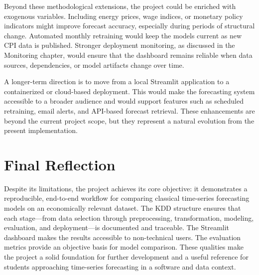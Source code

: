 Beyond these methodological extensions, the project could be enriched with exogenous variables. Including energy prices, wage indices, or monetary policy indicators might improve forecast accuracy, especially during periods of structural change. Automated monthly retraining would keep the models current as new CPI data is published. Stronger deployment monitoring, as discussed in the Monitoring chapter, would ensure that the dashboard remains reliable when data sources, dependencies, or model artifacts change over time.

A longer-term direction is to move from a local Streamlit application to a containerized or cloud-based deployment. This would make the forecasting system accessible to a broader audience and would support features such as scheduled retraining, email alerts, and API-based forecast retrieval. These enhancements are beyond the current project scope, but they represent a natural evolution from the present implementation.

\section{Final Reflection}

Despite its limitations, the project achieves its core objective: it demonstrates a reproducible, end-to-end workflow for comparing classical time-series forecasting models on an economically relevant dataset. The KDD structure ensures that each stage---from data selection through preprocessing, transformation, modeling, evaluation, and deployment---is documented and traceable. The Streamlit dashboard makes the results accessible to non-technical users. The evaluation metrics provide an objective basis for model comparison. These qualities make the project a solid foundation for further development and a useful reference for students approaching time-series forecasting in a software and data context.
